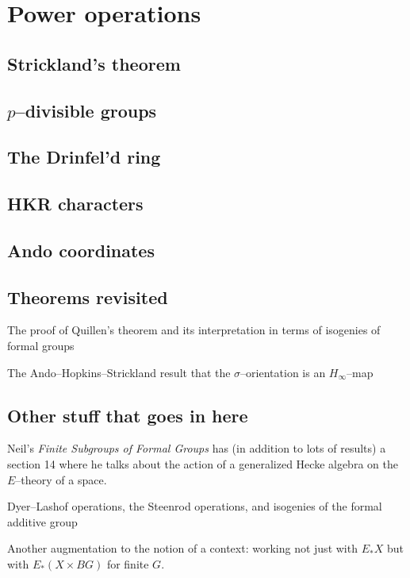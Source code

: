 
\chapter{Power operations}

\section{Strickland's theorem}

\section{$p$--divisible groups}

\section{The Drinfel'd ring}

\section{HKR characters}

\section{Ando coordinates}

\section{Theorems revisited}

The proof of Quillen's theorem and its interpretation in terms of isogenies of formal groups

The Ando--Hopkins--Strickland result that the $\sigma$--orientation is an $H_\infty$--map

\section*{Other stuff that goes in here}

Neil's \textit{Finite Subgroups of Formal Groups} has (in addition to lots of results) a section 14 where he talks about the action of a generalized Hecke algebra on the $E$--theory of a space.

Dyer--Lashof operations, the Steenrod operations, and isogenies of the formal additive group 

Another augmentation to the notion of a context: working not just with $E_* X$ but with $E_*(X \times BG)$ for finite $G$.
